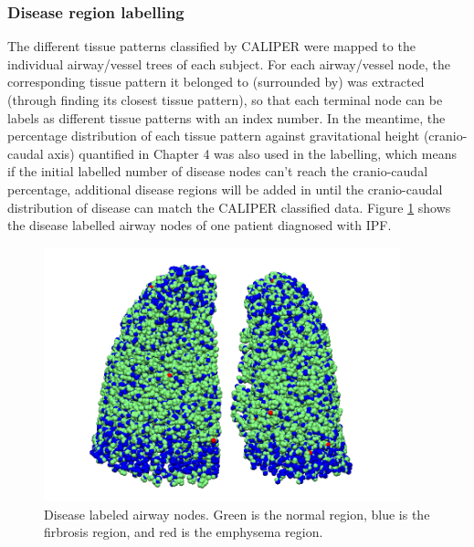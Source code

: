\subsubsection{Disease region labelling}
The different tissue patterns classified by CALIPER were mapped to the individual airway/vessel trees of each subject. For each airway/vessel node, the corresponding tissue pattern it belonged to (surrounded by) was extracted (through finding its closest tissue pattern), so that each terminal node can be labels as different tissue patterns with an index number. In the meantime, the percentage distribution of each tissue pattern against gravitational height (cranio-caudal axis) quantified in Chapter 4 was also used in the labelling, which means if the initial labelled number of disease nodes can't reach the cranio-caudal percentage, additional disease regions will be added in until the cranio-caudal distribution of disease can match the CALIPER classified data. Figure \ref{fig:DiseaseLabeling} shows the disease labelled airway nodes of one patient diagnosed with IPF.
\newpage

\begin{figure}[htbp]
  \centering 
  \includegraphics[height=2.9in]{ModelBasedAnalysis/Image/IPF501_DiseaseDistribution_BasedVentilation.png}
  \caption{Disease labeled airway nodes. Green is the normal region, blue is the firbrosis region, and red is the emphysema region.}
  \label{fig:DiseaseLabeling}
\end{figure}

